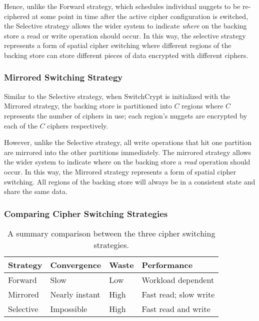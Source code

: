 Hence, unlike the Forward strategy, which schedules individual nuggets to be
re-ciphered at some point in time after the active cipher configuration is
switched, the Selective strategy allows the wider system to indicate
\emph{where} on the backing store a read or write operation should occur. In
this way, the selective strategy represents a form of spatial cipher switching
where different regions of the backing store can store different pieces of data
encrypted with different ciphers. 

\subsubsection{Mirrored Switching Strategy}

Similar to the Selective strategy, when SwitchCrypt is initialized with the
Mirrored strategy, the backing store is partitioned into $C$ regions where $C$
represents the number of ciphers in use; each region's nuggets are encrypted by
each of the $C$ ciphers respectively.

However, unlike the Selective strategy, all write operations that hit one
partition are mirrored into the other partitions immediately. The mirrored
strategy allows the wider system to indicate where on the backing store a
\emph{read} operation should occur. In this way, the Mirrored strategy
represents a form of spatial cipher switching. All regions of the backing store
will always be in a consistent state and share the same data.

\subsubsection{Comparing Cipher Switching Strategies}

\begin{table}[]
   \begin{tabular}{@{}|l|l|l|l|@{}}
      \toprule
      \textbf{Strategy} & \textbf{Convergence} & \textbf{Waste} & \textbf{Performance} \\ \midrule
      Forward   & Slow           & Low  & Workload dependent    \\
      \hline
      Mirrored  & Nearly instant & High & Fast read; slow write \\
      \hline
      Selective & Impossible     & High & Fast read and write   \\
      \hline
   \end{tabular}
   \caption{A summary comparison between the three cipher switching strategies.}
   \label{tbl:strategies-advantages}
\end{table}


